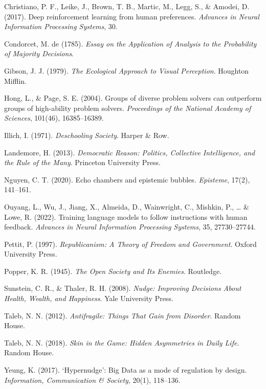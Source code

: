 \documentclass[
]{article}
\begin{document}
Christiano, P. F., Leike, J., Brown, T. B., Martic, M., Legg, S., \&
Amodei, D. (2017). Deep reinforcement learning from human preferences.
\emph{Advances in Neural Information Processing Systems}, 30.

Condorcet, M. de (1785). \emph{Essay on the Application of Analysis to
the Probability of Majority Decisions}.

Gibson, J. J. (1979). \emph{The Ecological Approach to Visual
Perception}. Houghton Mifflin.

Hong, L., \& Page, S. E. (2004). Groups of diverse problem solvers can
outperform groups of high-ability problem solvers. \emph{Proceedings of
the National Academy of Sciences}, 101(46), 16385--16389.

Illich, I. (1971). \emph{Deschooling Society}. Harper \& Row.

Landemore, H. (2013). \emph{Democratic Reason: Politics, Collective
Intelligence, and the Rule of the Many}. Princeton University Press.

Nguyen, C. T. (2020). Echo chambers and epistemic bubbles.
\emph{Episteme}, 17(2), 141--161.

Ouyang, L., Wu, J., Jiang, X., Almeida, D., Wainwright, C., Mishkin, P.,
\ldots{} \& Lowe, R. (2022). Training language models to follow
instructions with human feedback. \emph{Advances in Neural Information
Processing Systems}, 35, 27730--27744.

Pettit, P. (1997). \emph{Republicanism: A Theory of Freedom and
Government}. Oxford University Press.

Popper, K. R. (1945). \emph{The Open Society and Its Enemies}.
Routledge.

Sunstein, C. R., \& Thaler, R. H. (2008). \emph{Nudge: Improving
Decisions About Health, Wealth, and Happiness}. Yale University Press.

Taleb, N. N. (2012). \emph{Antifragile: Things That Gain from Disorder}.
Random House.

Taleb, N. N. (2018). \emph{Skin in the Game: Hidden Asymmetries in Daily
Life}. Random House.

Yeung, K. (2017). `Hypernudge': Big Data as a mode of regulation by
design. \emph{Information, Communication \& Society}, 20(1), 118--136.
\end{document}
